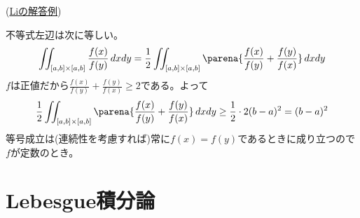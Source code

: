\begin{probans} %
(\href{https://drive.google.com/file/d/1anaTAHLXhDH8Ng_6pvw6pPFb4MDD5v7i/view?usp=sharing}{Liの解答例})
\end{probans}

\begin{probans} %
不等式左辺は次に等しい。
\[\iint_{[a,b]\times [a,b]} \dfrac{f(x)}{f(y)} \, dxdy = \dfrac{1}{2} \iint_{[a,b]\times[a,b]} \parena{\dfrac{f(x)}{f(y)} + \dfrac{f(y)}{f(x)}}\, dxdy \]
$f$は正値だから$\frac{f(x)}{f(y)} + \frac{f(y)}{f(x)} \geq 2$である。よって
\[\dfrac{1}{2} \iint_{[a,b]\times[a,b]} \parena{\dfrac{f(x)}{f(y)} + \dfrac{f(y)}{f(x)}}\, dxdy\geq \dfrac{1}{2}\cdot 2(b-a)^2 = (b-a)^2\]
等号成立は(連続性を考慮すれば)常に$f(x) = f(y)$であるときに成り立つので$f$が定数のとき。
\end{probans}

\setcounter{chapter}{11}
\section{Lebesgue積分論}

